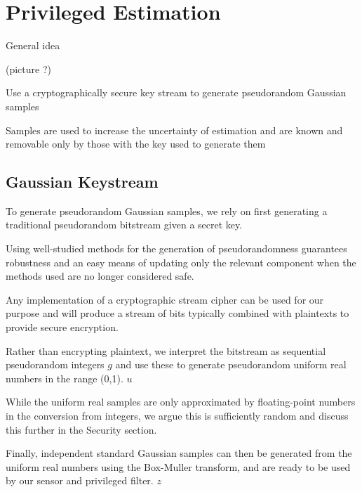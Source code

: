 \documentclass[conference]{IEEEtran}
\theoremstyle{definition}
\theoremstyle{definition}
\theoremstyle{remark}
\begin{document}
\section{Privileged Estimation}
General idea

(picture ?)

Use a cryptographically secure key stream to generate pseudorandom Gaussian samples

Samples are used to increase the uncertainty of estimation and are known and removable only by those with the key used to generate them

% 
% 

\subsection{Gaussian Keystream}
To generate pseudorandom Gaussian samples, we rely on first generating a traditional pseudorandom bitstream given a secret key.

Using well-studied methods for the generation of pseudorandomness guarantees robustness and an easy means of updating only the relevant component when the methods used are no longer considered safe.

Any implementation of a cryptographic stream cipher can be used for our purpose and will produce a stream of bits typically combined with plaintexts to provide secure encryption.

Rather than encrypting plaintext, we interpret the bitstream as sequential pseudorandom integers $g$ and use these to generate pseudorandom uniform real numbers in the range (0,1). $u$

While the uniform real samples are only approximated by floating-point numbers in the conversion from integers, we argue this is sufficiently random and discuss this further in the Security section.

Finally, independent standard Gaussian samples can then be generated from the uniform real numbers using the Box-Muller transform, and are ready to be used by our sensor and privileged filter. $z$
\end{document}
